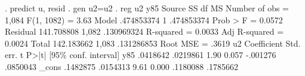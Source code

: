 . predict u, resid
{\smallskip}
. gen u2=u{\caret}2
{\smallskip}
. reg u2 y85
{\smallskip}
      Source {\VBAR}       SS           df       MS      Number of obs   =     1,084
   F(1, 1082)      =      3.63
       Model {\VBAR}  .474853374         1  .474853374   Prob > F        =    0.0572
    Residual {\VBAR}  141.708808     1,082  .130969324   R-squared       =    0.0033
   Adj R-squared   =    0.0024
       Total {\VBAR}  142.183662     1,083  .131286853   Root MSE        =     .3619
{\smallskip}
          u2 {\VBAR} Coefficient  Std. err.      t    P>|t|     [95\% conf. interval]
         y85 {\VBAR}   .0418642   .0219861     1.90   0.057     -.001276    .0850043
       _cons {\VBAR}   .1482875   .0154313     9.61   0.000     .1180088    .1785662
{\smallskip}
